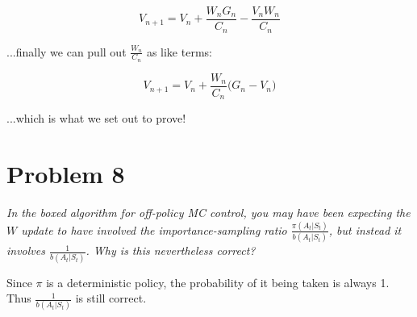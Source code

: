 \documentclass{article}
\begin{document}
\begin{equation}
    V_{n+1} = V_n + \frac{W_n G_n}{C_n} - \frac{V_n W_n} {C_n}
\end{equation}

...finally we can pull out $\frac{W_n}{C_n}$ as like terms:

\begin{equation}
    V_{n+1} = V_n + \frac{W_n}{C_n} \bigg(G_n - V_n \bigg)
\end{equation}

...which is what we set out to prove!

\section*{Problem 8}
\textit{In the boxed algorithm for off-policy MC control, you may have been expecting the $W$ update to have involved the importance-sampling ratio $\frac{\pi(A_t|S_t)}{b(A_t|S_t)}$, but instead it involves $\frac{1}{b(A_t|S_t)}$. Why is this nevertheless correct?}

Since $\pi$ is a deterministic policy, the probability of it being taken is always 1. Thus $\frac{1}{b(A_t|S_t)}$ is still correct.
\end{document}
